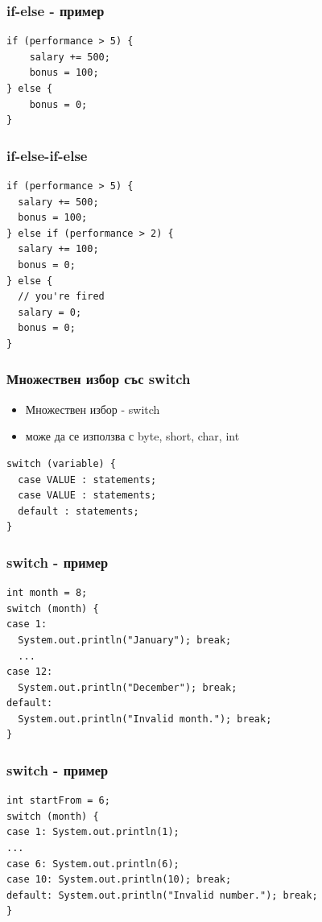 \documentclass{beamer}
\begin{document}
\begin{frame}[fragile]
  \frametitle{if-else - пример}
  \transdissolve
\begin{lstlisting}
if (performance > 5) {
    salary += 500;
    bonus = 100;
} else {
    bonus = 0;
}
\end{lstlisting}
\end{frame}

\begin{frame}[fragile]
  \frametitle{if-else-if-else}
  \transdissolve
\begin{lstlisting}
if (performance > 5) {
  salary += 500;
  bonus = 100;
} else if (performance > 2) {
  salary += 100;
  bonus = 0;
} else { 
  // you're fired
  salary = 0; 
  bonus = 0; 
}
\end{lstlisting}
\end{frame}

\begin{frame}[fragile]
  \frametitle{Множествен избор със switch}
  \transdissolve
  \begin{itemize}
  \item Множествен избор - switch \pause
  \item може да се
    използва с byte, short, char, int \pause
  \end{itemize}
  \begin{lstlisting}
switch (variable) {
  case VALUE : statements;
  case VALUE : statements;
  default : statements;
}
  \end{lstlisting}
\end{frame}

\begin{frame}[fragile]
  \transdissolve
  \frametitle{switch - пример}
\begin{lstlisting}
int month = 8;
switch (month) {
case 1: 
  System.out.println("January"); break;
  ...
case 12:
  System.out.println("December"); break;
default: 
  System.out.println("Invalid month."); break;
}
\end{lstlisting}
\end{frame}

\begin{frame}[fragile]
  \frametitle{switch - пример}
  \transdissolve
\begin{lstlisting}
int startFrom = 6;
switch (month) {
case 1: System.out.println(1);
...
case 6: System.out.println(6);
case 10: System.out.println(10); break;
default: System.out.println("Invalid number."); break;
}
\end{lstlisting}
\end{frame}
\end{document}
